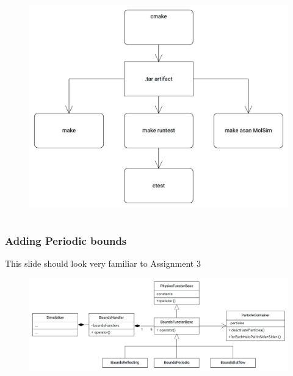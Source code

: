\begin{frame}
\begin{columns}
		\begin{column}{0.7\textwidth}
			\vspace{-1.5cm}
			\begin{figure}
				\centering
				\includegraphics[width=0.8\linewidth]{cicd_new}
				\label{fig:cicdnew}
			\end{figure}
			
		\end{column}
		
	\end{columns}
\end{frame}

\begin{frame}
	\frametitle{Adding Periodic bounds}
	\large
	This slide should look very familiar to Assignment 3
		\begin{figure}
			\centering
			\includegraphics[width=0.95\linewidth]{BoundaryMolSim}
			\label{fig:boundarymolsim}
		\end{figure}
\end{frame}

